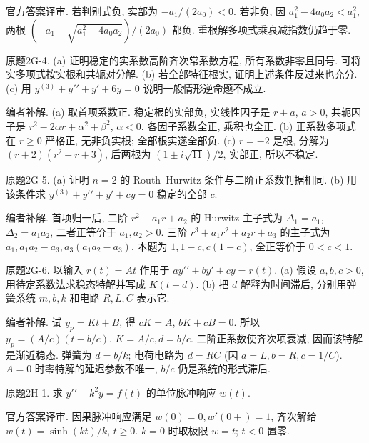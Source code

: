 \begin{solution}
官方答案译审. 若判别式负, 实部为 $-a_1/(2a_0)<0$. 若非负, 因 $a_1^2-4a_0a_2<a_1^2$, 两根 $(-a_1\pm\sqrt{a_1^2-4a_0a_2})/(2a_0)$ 都负. 重根解多项式乘衰减指数仍趋于零.
\end{solution}
\begin{exercise}\label{cw:bank-2G-4}
原题2G-4. (a) 证明稳定的实系数高阶齐次常系数方程, 所有系数非零且同号. 可将实多项式按实根和共轭对分解. (b) 若全部特征根实, 证明上述条件反过来也充分. (c) 用 $y^{(3)}+y\prime\prime+y\prime+6y=0$ 说明一般情形逆命题不成立.
\end{exercise}
\begin{solution}
编者补解. (a) 取首项系数正. 稳定根的实部负, 实线性因子是 $r+a$, $a>0$, 共轭因子是 $r^2-2\alpha r+\alpha^2+\beta^2$, $\alpha<0$. 各因子系数全正, 乘积也全正. (b) 正系数多项式在 $r\ge0$ 严格正, 无非负实根; 全部根实遂全部负. (c) $r=-2$ 是根, 分解为 $(r+2)(r^2-r+3)$, 后两根为 $(1\pm i\sqrt{11})/2$, 实部正, 所以不稳定.
\end{solution}
\begin{exercise}\label{cw:bank-2G-5}
原题2G-5. (a) 证明 $n=2$ 的 Routh--Hurwitz 条件与二阶正系数判据相同. (b) 用该条件求 $y^{(3)}+y\prime\prime+y\prime+cy=0$ 稳定的全部 $c$.
\end{exercise}
\begin{solution}
编者补解. 首项归一后, 二阶 $r^2+a_1r+a_2$ 的 Hurwitz 主子式为 $\Delta_1=a_1$, $\Delta_2=a_1a_2$, 二者正等价于 $a_1,a_2>0$. 三阶 $r^3+a_1r^2+a_2r+a_3$ 的主子式为 $a_1,a_1a_2-a_3,a_3(a_1a_2-a_3)$. 本题为 $1,1-c,c(1-c)$, 全正等价于 $0<c<1$.
\end{solution}
\begin{exercise}\label{cw:bank-2G-6}
原题2G-6. 以输入 $r(t)=At$ 作用于 $ay\prime\prime+by\prime+cy=r(t)$. (a) 假设 $a,b,c>0$, 用待定系数法求稳态特解并写成 $K(t-d)$. (b) 把 $d$ 解释为时间滞后, 分别用弹簧系统 $m,b,k$ 和电路 $R,L,C$ 表示它.
\end{exercise}
\begin{solution}
编者补解. 试 $y_p=Kt+B$, 得 $cK=A$, $bK+cB=0$. 所以 $y_p=(A/c)(t-b/c)$, $K=A/c,d=b/c$. 二阶正系数使齐次项衰减, 因而该特解是渐近稳态. 弹簧为 $d=b/k$; 电荷电路为 $d=RC$ (因 $a=L,b=R,c=1/C$). $A=0$ 时零特解的延迟参数不唯一, $b/c$ 仍是系统的形式滞后.
\end{solution}
\begin{exercise}\label{cw:bank-2H-1}
原题2H-1. 求 $y\prime\prime-k^2y=f(t)$ 的单位脉冲响应 $w(t)$.
\end{exercise}
\begin{solution}
官方答案译审. 因果脉冲响应满足 $w(0)=0,w\prime(0+)=1$, 齐次解给 $w(t)=\sinh(kt)/k$, $t\ge0$. $k=0$ 时取极限 $w=t$; $t<0$ 置零.
\end{solution}
